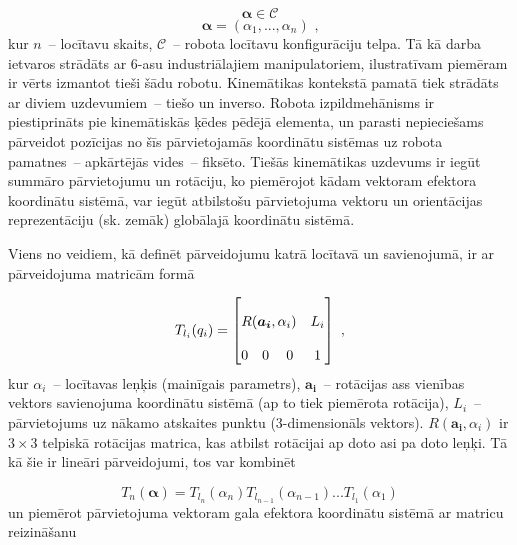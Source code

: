 \documentclass[12pt, a4paper]{article}
\numberwithin{equation}{section} %
\begin{document}
\begin{equation}
    \boldsymbol{\alpha} \in \mathcal{C}
\end{equation}
\begin{equation}
    \boldsymbol{\alpha} = (\alpha_1, ..., \alpha_n)
\text{ ,}
\end{equation}
kur $n$~-- locītavu skaits, $\mathcal{C}$~-- robota locītavu konfigurāciju telpa. Tā kā darba ietvaros strādāts ar 6-asu industriālajiem manipulatoriem, ilustratīvam piemēram ir vērts izmantot tieši šādu robotu. Kinemātikas kontekstā pamatā tiek strādāts ar diviem uzdevumiem~-- tiešo un inverso. Robota izpildmehānisms ir piestiprināts pie kinemātiskās ķēdes pēdējā elementa, un parasti nepieciešams pārveidot pozīcijas no šīs pārvietojamās koordinātu sistēmas uz robota pamatnes~-- apkārtējās vides~-- fiksēto. Tiešās kinemātikas uzdevums ir iegūt summāro pārvietojumu un rotāciju, ko piemērojot kādam vektoram efektora koordinātu sistēmā, var iegūt atbilstošu pārvietojuma vektoru un orientācijas reprezentāciju (sk. zemāk) globālajā koordinātu sistēmā. 

Viens no veidiem, kā definēt pārveidojumu katrā locītavā un savienojumā, ir ar pārveidojuma matricām formā

\begin{equation}
    T_{l_i}(q_i) =
    \begin{bmatrix}
        \multicolumn{3}{c}{\multirow{3}{*}{$R(\boldsymbol{a_i},\alpha_i)$}} & \multirow{3}{*}{$L_i$} \\
        \multicolumn{3}{c}{} & \multirow{3}{*}{} \\
        \multicolumn{3}{c}{} & \multirow{3}{*}{} \\
        0 & 0 & 0 & 1
    \end{bmatrix}
\text{ ,}
\end{equation}
kur $\alpha_i$~-- locītavas leņķis (mainīgais parametrs), $\boldsymbol{a_i}$~-- rotācijas ass vienības vektors savienojuma koordinātu sistēmā (ap to tiek piemērota rotācija), $L_i$~-- pārvietojums uz nākamo atskaites punktu (3-dimensionāls vektors). $R(\boldsymbol{a_i},\alpha_i)$ ir $3 \times 3$ telpiskā rotācijas matrica, kas atbilst rotācijai ap doto asi pa doto leņķi. Tā kā šie ir lineāri pārveidojumi, tos var kombinēt

\begin{equation}
    T_{n}(\boldsymbol{\alpha}) = T_{l_n}(\alpha_n)T_{l_{n-1}}(\alpha_{n-1})...T_{l_{1}}(\alpha_{1})
\end{equation}
un piemērot pārvietojuma vektoram gala efektora koordinātu sistēmā ar matricu reizināšanu
\end{document}
